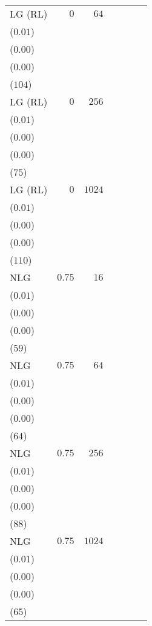 \begin{table*}[t]
\begin{tabular}{lrrrrrr}
LG {\scriptsize(RL)} & \(0\) & \(64\) & \longcell{\(0.04\)\\{\tiny(\(0.01\))}} & \longcell{\(0.00\)\\{\tiny(\(0.00\))}} & \longcell{\(0.84\)\\{\tiny(\(0.00\))}} & \longcell{\(6232\)\\{\tiny(\(104\))}} \\[2.2ex]
LG {\scriptsize(RL)} & \(0\) & \(256\) & \longcell{\(0.05\)\\{\tiny(\(0.01\))}} & \longcell{\(0.00\)\\{\tiny(\(0.00\))}} & \longcell{\(0.84\)\\{\tiny(\(0.00\))}} & \longcell{\(6122\)\\{\tiny(\(75\))}} \\[2.2ex]
LG {\scriptsize(RL)} & \(0\) & \(1024\) & \longcell{\(0.07\)\\{\tiny(\(0.01\))}} & \longcell{\(0.00\)\\{\tiny(\(0.00\))}} & \longcell{\(0.84\)\\{\tiny(\(0.00\))}} & \longcell{\(6108\)\\{\tiny(\(110\))}} \\[2.2ex]
NLG & \(0.75\) & \(16\) & \longcell{\(0.02\)\\{\tiny(\(0.01\))}} & \longcell{\(0.00\)\\{\tiny(\(0.00\))}} & \longcell{\(0.84\)\\{\tiny(\(0.00\))}} & \longcell{\(6291\)\\{\tiny(\(59\))}} \\[2.2ex]
NLG & \(0.75\) & \(64\) & \longcell{\(0.04\)\\{\tiny(\(0.01\))}} & \longcell{\(0.00\)\\{\tiny(\(0.00\))}} & \longcell{\(0.84\)\\{\tiny(\(0.00\))}} & \longcell{\(6183\)\\{\tiny(\(64\))}} \\[2.2ex]
NLG & \(0.75\) & \(256\) & \longcell{\(0.07\)\\{\tiny(\(0.01\))}} & \longcell{\(0.00\)\\{\tiny(\(0.00\))}} & \longcell{\(0.84\)\\{\tiny(\(0.00\))}} & \longcell{\(6128\)\\{\tiny(\(88\))}} \\[2.2ex]
NLG & \(0.75\) & \(1024\) & \longcell{\(0.10\)\\{\tiny(\(0.01\))}} & \longcell{\(0.00\)\\{\tiny(\(0.00\))}} & \longcell{\(0.84\)\\{\tiny(\(0.00\))}} & \longcell{\(6101\)\\{\tiny(\(65\))}} \\[2.2ex]

\end{tabular}
\end{table*}
